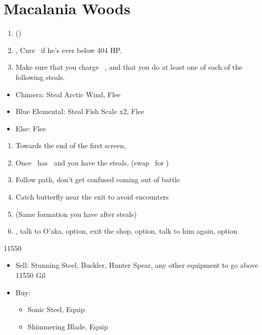 \chapter{Macalania Woods}

\begin{enumerate}
    \item \formation{\tidus}{\rikku}{\auron} (\swap{\wakka}{\rikku})
    \item \save, Cure \tidus\ if he's ever below 404 HP.
    \item Make sure that you charge \rikku\ \od, and that you do at least one of each of the following steals.
\end{enumerate}
\begin{encounters}
    \begin{itemize}
        \item Chimera: Steal Arctic Wind, Flee
        \item Blue Elemental: Steal Fish Scale x2, Flee
        \item Else: Flee
    \end{itemize}
\end{encounters}
\begin{enumerate}[resume]
    \item Towards the end of the first screen, 
    \item Once \rikku\ has \od\ and you have the steals, \formation{\tidus}{\kimahri}{\auron} (swap \rikku\ for \kimahri)
    \item Follow path, don't get confused coming out of battle
    \item Catch butterfly near the exit to avoid encounters
    \item \formation{\tidus}{\kimahri}{\auron} (Same formation you have after steals)
    \item \save, talk to O'aka,  option, exit the shop,  option, talk to him again,  option
\end{enumerate}
\begin{shop}{11550}
    \begin{itemize}
        \item Sell: Stunning Steel, Buckler, Hunter Spear, any other equipment to go above 11550 Gil
        \item Buy:
        \begin{itemize}
            \item Sonic Steel, Equip
            \item Shimmering Blade, Equip
        \end{itemize}
    \end{itemize}
\end{shop}
